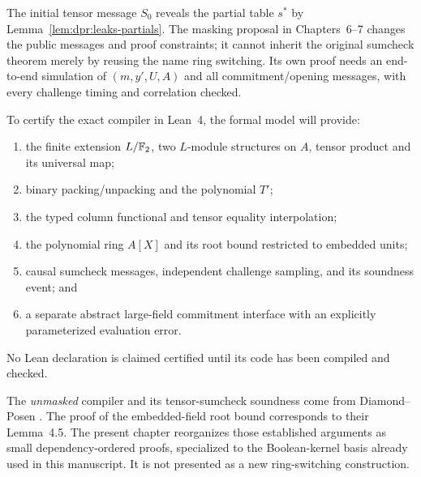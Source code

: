\begin{remark}
The initial tensor message
$S_0$ reveals the partial table
$s^*$ by Lemma~\ref{lem:dpr:leaks-partials}.
The masking proposal in
Chapters~6--7 changes the
public messages and proof
constraints; it cannot inherit
the original sumcheck theorem
merely by reusing the name
ring switching.
Its own proof needs an
end-to-end simulation of
$(m,y',U,A)$ and all
commitment/opening messages,
with every challenge timing
and correlation checked.
\end{remark}

\begin{definition}\label{def:dpr:lean-contract}
To certify the exact compiler
in Lean~4, the formal model
will provide:
\begin{enumerate}[label=\textup{(\roman*)}]
\item the finite extension
$L/\mathbb{F}_2$, two $L$-module
structures on $A$, tensor
product and its universal map;
\item binary packing/unpacking
and the polynomial $T'$;
\item the typed column functional
and tensor equality interpolation;
\item the polynomial ring $A[X]$
and its root bound restricted
to embedded units;
\item causal sumcheck messages,
independent challenge sampling,
and its soundness event; and
\item a separate abstract
large-field commitment interface
with an explicitly parameterized
evaluation error.
\end{enumerate}
No Lean declaration is claimed
certified until its code has
been compiled and checked.
\end{definition}

\begin{remark}
The \emph{unmasked} compiler and
its tensor-sumcheck soundness
come from Diamond--Posen
\cite[Construction~4.1, Theorems~4.2 and~4.4]{DiamondPosen2024}.
The proof of the embedded-field
root bound corresponds to
their Lemma~4.5.
The present chapter reorganizes
those established arguments
as small dependency-ordered
proofs, specialized to the
Boolean-kernel basis already
used in this manuscript.
It is not presented as a
new ring-switching construction.
\end{remark}
